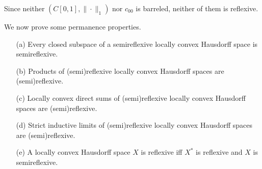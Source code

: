 \begin{example}
Since neither $(C[0, 1],\|\cdot\|_1)$ nor $c_{00}$ is barreled, neither of them is reflexive.
\end{example}
We now prove some permanence properties.
\begin{proposition}\label{LCHS reflexive permanence}
\mbox{}
\begin{itemize}
\item[(a)] Every closed subspace of a semireflexive locally convex Hausdorff space is semireflexive.
\item[(b)] Products of (semi)reflexive locally convex Hausdorff spaces are (semi)reflexive.
\item[(c)] Locally convex direct sums of (semi)reflexive locally convex Hausdorff spaces are (semi)reflexive.
\item[(d)] Strict inductive limits of (semi)reflexive locally convex Hausdorff spaces are (semi)reflexive.
\item[(e)] A locally convex Hausdorff space $X$ is reflexive iff $X^*$ is reflexive and $X$ is semireflexive.
\end{itemize}
\end{proposition}
